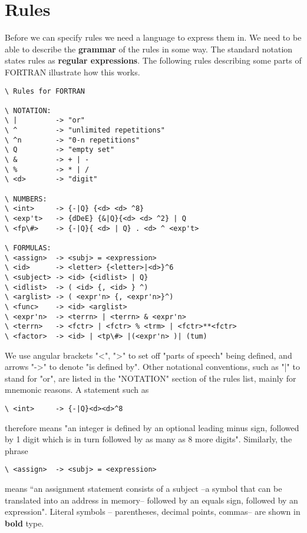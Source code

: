 \section{Rules}
Before we can specify rules we need a language to express them in. We need to be able to describe the \textbf{grammar} of the rules in some way. The standard notation states rules as \textbf{regular expressions}. The following rules describing some parts of FORTRAN illustrate how this works.

\begin{verbatim}
\ Rules for FORTRAN

\ NOTATION:
\ |         -> "or"
\ ^         -> "unlimited repetitions"
\ ^n        -> "0-n repetitions"
\ Q         -> "empty set"
\ &         -> + | -
\ %         -> * | /
\ <d>       -> "digit"

\ NUMBERS:
\ <int>     -> {-|Q} {<d> <d> ^8}
\ <exp't>   -> {dDeE} {&|Q}{<d> <d> ^2} | Q
\ <fp\#>    -> {-|Q}{ <d> | Q} . <d> ^ <exp't>

\ FORMULAS:
\ <assign>  -> <subj> = <expression>
\ <id>      -> <letter> {<letter>|<d>}^6
\ <subject> -> <id> {<idlist> | Q}
\ <idlist>  -> ( <id> {, <id> } ^)
\ <arglist> -> ( <expr'n> {, <expr'n>}^)
\ <func>    -> <id> <arglist>
\ <expr'n>  -> <terrn> | <terrn> & <expr'n>
\ <terrn>   -> <fctr> | <fctr> % <trm> | <fctr>**<fctr>
\ <factor>  -> <id> | <tp\#> |(<expr'n> )| (tum)

\end{verbatim}

We use angular brackets "<", ">" to set off "parts of speech" being defined, and arrows "->" to denote "is defined by". Other notational conventions, such as "|" to stand for "or", are listed in the "NOTATION" section of the rules list, mainly for mnemonic reasons. A statement such as

\begin{verbatim}
\ <int>     -> {-|Q}<d><d>^8
\end{verbatim}

therefore means "an integer is defined by an optional leading minus sign, followed by 1 digit which is in turn followed by as many as 8 more digits". Similarly, the phrase

\begin{verbatim}
\ <assign>  -> <subj> = <expression>
\end{verbatim}

means “an assignment statement consists of a subject --a symbol that can be translated into an address in memory-- followed by an equals sign, followed by an expression". Literal symbols -- parentheses, decimal points, commas-- are shown in \textbf{bold} type.

